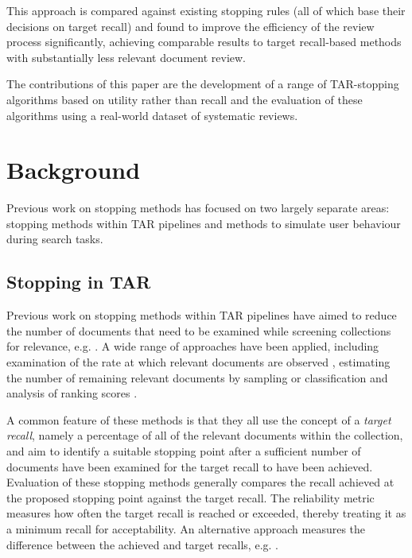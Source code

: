 \documentclass[sigconf,natbib=true,anonymous=true]{acmart}
\begin{document}
This approach is compared against existing stopping rules (all of which base their decisions on target recall) and found to improve the efficiency of the review process significantly, achieving comparable results to target recall-based methods with substantially less relevant document review.

The contributions of this paper are the development of a range of TAR-stopping algorithms based on utility rather than recall and the evaluation of these algorithms using a real-world dataset of systematic reviews. 

\section{Background}


Previous work on stopping methods has focused on two largely separate areas: stopping methods within TAR pipelines and methods to simulate user behaviour during search tasks. 

\subsection{Stopping in TAR} Previous work on stopping methods within TAR pipelines have aimed to reduce the number of documents that need to be examined while screening collections for relevance, e.g. \cite{cormack2016engineering,li2020stop,lewis2021certifying,stevenson2023stopping}. 
A wide range of approaches have been applied, including examination of the rate at which relevant documents are observed \cite{cormack2016engineering,stevenson2023stopping}, estimating the number of remaining relevant documents by sampling or classification \cite{shemilt2014pinpointing,callaghan2020statistical,cormack2016scalability,li2020stop} and analysis of ranking scores \cite{hollmann2017ranking,di2018study}.

A common feature of these methods is that they all use the concept of a {\it target recall}, namely a percentage of all of the relevant documents within the collection, and aim to identify a suitable stopping point after a sufficient number of documents have been examined for the target recall to have been achieved. Evaluation of these stopping methods generally compares the recall achieved at the proposed stopping point against the target recall. The reliability metric \cite{cormack2016engineering} measures how often the target recall is reached or exceeded, thereby treating it as a minimum recall for acceptability. An alternative approach measures the difference between the achieved and target recalls, e.g. \cite{li2020stop,stevenson2023stopping}. 
\end{document}
